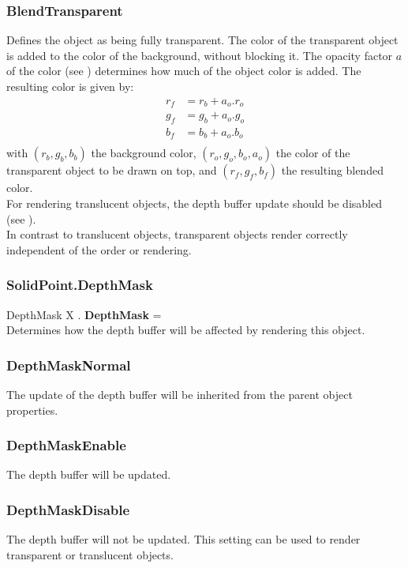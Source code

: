 \subsubsection{BlendTransparent \label{T:BlendType|BlendTransparent}}
Defines the object as being fully transparent. The color of the transparent object is added to the color of the background, without blocking it. The opacity factor $a$ of the color (see ) determines how much of the object color is added. The resulting color is given by:
\begin{equation}
\begin{array}{rcl}
r_f & = r_b + a_o . r_o \\
g_f & = g_b + a_o . g_o \\
b_f & = b_b + a_o . b_o \\
\end{array}
\end{equation}
with $(r_b,g_b,b_b)$ the background color, $(r_o,g_o,b_o,a_o)$ the color of the transparent object to be drawn on top, and $(r_f,g_f,b_f)$ the resulting blended color. \\
For rendering translucent objects, the depth buffer update should be disabled (see ). \\
In contrast to translucent objects, transparent objects render correctly independent of the order or rendering.

\subsubsection{SolidPoint.DepthMask \label{F:SolidPoint:DepthMask}}
DepthMask X . \textbf{DepthMask} = \\
Determines how the depth buffer will be affected by rendering this object.

\subsubsection{DepthMaskNormal \label{T:DepthMask|DepthMaskNormal}}
The update of the depth buffer will be inherited from the parent object properties.

\subsubsection{DepthMaskEnable \label{T:DepthMask|DepthMaskEnable}}
The depth buffer will be updated.

\subsubsection{DepthMaskDisable \label{T:DepthMask|DepthMaskDisable}}
The depth buffer will not be updated. This setting can be used to render transparent or translucent objects.

